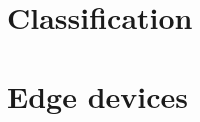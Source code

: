 \documentclass[../main.tex]{subfiles}
\begin{document}
\section{Classification}
\label{sec:classification_experiments}

\section{Edge devices}
\label{sec:edge_devices_experiments}
\end{document}
